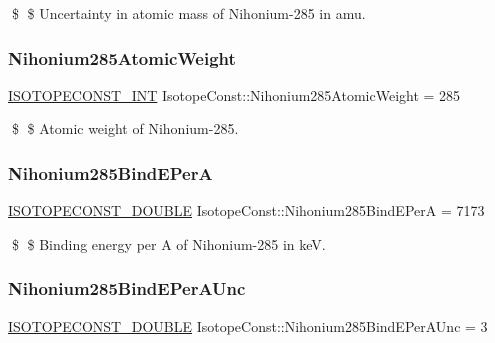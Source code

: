 \$ \$ Uncertainty in atomic mass of Nihonium-\/285 in amu. \mbox{\label{group___isotope_const-_nihonium-_nh285_gafb68ab9608b088de75a8223752bd5c70}} 
\subsubsection{\texorpdfstring{Nihonium285\+Atomic\+Weight}{Nihonium285AtomicWeight}}
{\footnotesize\ttfamily \mbox{\hyperlink{group___isotope_const-_macros_ga5f18360b3e99483a35c32d789e62621c}{I\+S\+O\+T\+O\+P\+E\+C\+O\+N\+S\+T\+\_\+\+I\+NT}} Isotope\+Const\+::\+Nihonium285\+Atomic\+Weight = 285}

\$ \$ Atomic weight of Nihonium-\/285. \mbox{\label{group___isotope_const-_nihonium-_nh285_gabf64ccfe09c4ca9208e1c5470e023f29}} 
\subsubsection{\texorpdfstring{Nihonium285\+Bind\+E\+PerA}{Nihonium285BindEPerA}}
{\footnotesize\ttfamily \mbox{\hyperlink{group___isotope_const-_macros_ga8f45a7272ce02c0b4c65c44636ed719a}{I\+S\+O\+T\+O\+P\+E\+C\+O\+N\+S\+T\+\_\+\+D\+O\+U\+B\+LE}} Isotope\+Const\+::\+Nihonium285\+Bind\+E\+PerA = 7173}

\$ \$ Binding energy per A of Nihonium-\/285 in keV. \mbox{\label{group___isotope_const-_nihonium-_nh285_ga2fb051212cf66d0bc88f4a43623c6bbd}} 
\subsubsection{\texorpdfstring{Nihonium285\+Bind\+E\+Per\+A\+Unc}{Nihonium285BindEPerAUnc}}
{\footnotesize\ttfamily \mbox{\hyperlink{group___isotope_const-_macros_ga8f45a7272ce02c0b4c65c44636ed719a}{I\+S\+O\+T\+O\+P\+E\+C\+O\+N\+S\+T\+\_\+\+D\+O\+U\+B\+LE}} Isotope\+Const\+::\+Nihonium285\+Bind\+E\+Per\+A\+Unc = 3}


